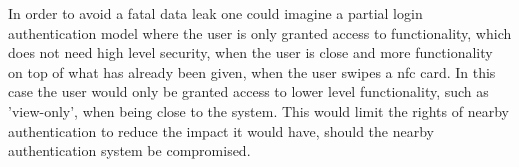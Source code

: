 In order to avoid a fatal data leak one could imagine a partial login authentication model where the user is only granted access to functionality, which does not need high level security, when the user is close and more functionality on top of what has already been given, when the user swipes a nfc card.
In this case the user would only be granted access to lower level functionality, such as 'view-only', when being close to the system. This would limit the rights of nearby authentication to reduce the impact it would have, should the nearby authentication system be compromised.


%
%
%
%
%
